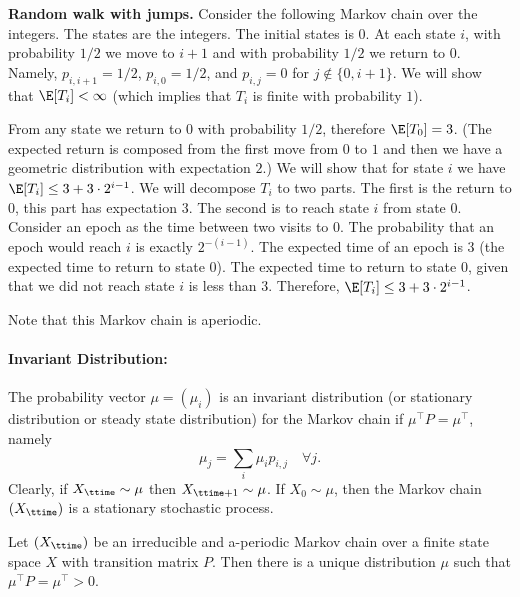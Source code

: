 \begin{example}
{\bf Random walk with jumps.}
%
Consider the following Markov chain over the integers. The states
are the integers. The initial states is $0$. At each state $i$, with
probability $1/2$ we move to $i+1$ and with probability $1/2$ we
return to $0$. Namely, $p_{i,i+1}=1/2$, $p_{i,0}=1/2$, and $p_{i,j}
=0$ for $j \not\in \{0,i+ 1\}$. We will show that $\E[T_i]<\infty$
(which implies that $T_i$ is finite with probability $1$).

From any state we return to $0$ with probability $1/2$, therefore
$\E[T_0]=3$. (The expected return is composed from the first move from $0$ to $1$ and then we have a geometric distribution with expectation $2$.) We will show that for state $i$ we have
$\E[T_i]\leq3+3\cdot 2^{i-1}$. We will decompose $T_i$ to two parts. The
first is the return to $0$, this part has expectation $3$. The
second is to reach state $i$ from state $0$. Consider an epoch as
the time between two visits to $0$. The probability that an epoch
would reach $i$ is exactly $2^{-(i-1)}$. The expected time of an epoch
is $3$ (the expected time to return to state $0$). The expected time
to return to state $0$, given that we did not reach state $i$ is
less than $3$. Therefore, $\E[T_i]\leq 3+3\cdot 2^{i-1}$.

Note that this Markov chain is aperiodic.
\end{example}



\paragraph{Invariant Distribution:} %
The probability vector $\mu  = ({\mu_i})$ is an invariant
distribution (or stationary distribution or steady state
distribution) for the Markov chain if $\mu^\top P = \mu^\top$,
namely
\[{\mu_j} = \sum_i {{\mu_i}} {p_{i,j}}\quad \forall j.\]
Clearly, if ${X_\ttime} \sim \mu $ then ${X_{\ttime + 1}} \sim \mu
$. If ${X_0} \sim \mu $, then the Markov chain $({X_\ttime})$ is a
stationary stochastic process.


\begin{theorem}
\label{Thm:MC-stationary}
 Let $({X_\ttime})$ be an irreducible and
a-periodic Markov chain over a finite state space $X$ with
transition matrix $P$. Then there is a unique distribution $\mu$
such that $\mu^\top P = \mu^\top >0$.
\end{theorem}

